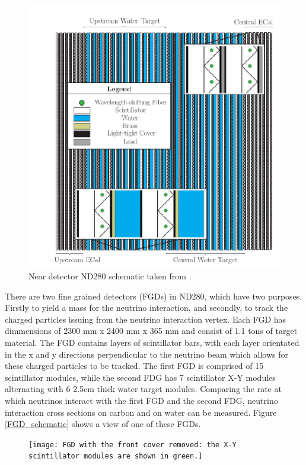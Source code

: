 \begin{figure}
    \includegraphics[width=\textwidth]{Figures/p0d.png}
    \caption{Near detector ND280 schematic taken from \cite{t2kcollaborationT2KExperiment2011}.}
\label{fig:p0d}
\end{figure}

There are two fine grained detectors (FGDs) in ND280, which have two purposes. Firstly to yield a mass for the neutrino interaction, and secondly, to track the charged particles issuing from the neutrino interaction vertex. Each FGD has dimmensions of 2300 mm x 2400 mm x 365 mm and consist of 1.1 tons of target material. The FGD  contains layers of scintillator bars, with each layer orientated in the x and y directions perpendicular to the neutrino beam which allows for these charged particles to be tracked. The first FGD is comprised of 15 scintillator modules, while the second FDG has 7 scintillator X-Y modules alternating with 6 2.5cm thick water target modules. Comparing the rate at which neutrinos interact with the first FGD and the second FDG, neutrino interaction cross sections on carbon and on water can be measured. Figure \ref{FGD_schematic} shows a view of one of these FGDs.

\begin{figure}
    \texttt{[image: FGD with the front cover removed: the X-Y scintillator modules are shown in green.]}
\label{fig:FGD_schematic}
\end{figure}

